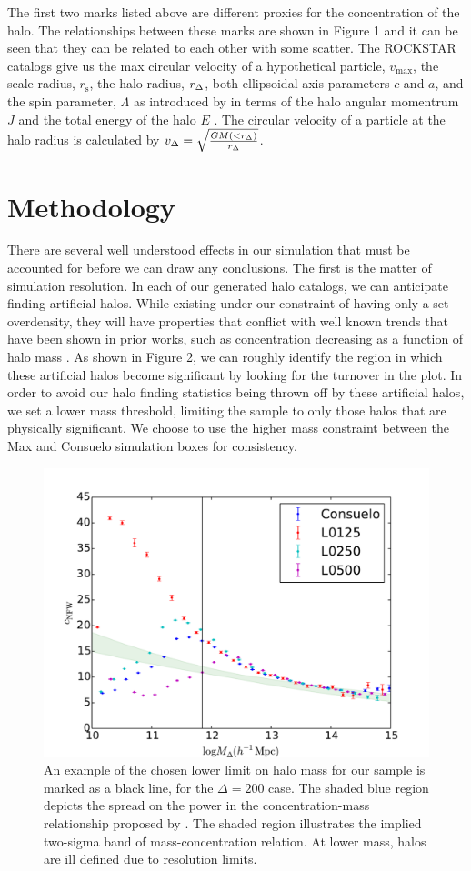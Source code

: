 \documentclass[usenatbib,usegraphicx,letterpaper]{mn2e}
\begin{document}
The first two marks listed above are different proxies for the concentration of the halo. The relationships between these marks are shown in Figure 1 and it can be seen that they can be related to each other with some scatter. The ROCKSTAR catalogs give us the max  circular velocity of a hypothetical particle, $v_{\mathrm{max}}$, the scale radius, $r_{\mathrm{s}}$, the halo radius, $r_{\Delta}$, both ellipsoidal axis parameters $c$ and $a$, and the spin parameter, $\Lambda$ as introduced by \citep{peebles69} in terms of the halo angular momentrum $J$ and the total energy of the halo $E$ . The circular velocity of a particle at the halo radius is calculated by $v_{\Delta} = \sqrt{\frac{G M(< r_{\Delta})}{r_{\Delta}}}$.

\section[]{Methodology}
\label{section:methodology}

There are several well understood effects in our simulation that must be accounted for before we can draw any conclusions. The first is the matter of simulation resolution. In each of our generated halo catalogs, we can anticipate finding artificial halos. While existing under our constraint of having only a set overdensity, they will have properties that conflict with well known trends that have been shown in prior works, such as concentration decreasing as a function of halo mass \citep{wechsler06}. As shown in Figure 2, we can roughly identify the region in which these artificial halos become significant by looking for the turnover in the plot. In order to avoid our halo finding statistics being thrown off by these artificial halos, we set a lower mass threshold, limiting the sample to only those halos that are physically significant. We choose to use the higher mass constraint between the Max and Consuelo simulation boxes for consistency.

\begin{figure}
	\centering
		\includegraphics[width=.5\textwidth]{masscut_cnfw_d200.pdf}
	\caption{An example of the chosen lower limit on halo mass for our sample is marked as a black line, for the $\Delta = 200$ case. The shaded blue region depicts the spread on the power in the concentration-mass relationship proposed by \citet{duffy08}.  The shaded region illustrates the implied two-sigma band of \citet{duffy08} mass-concentration relation. At lower mass, halos are ill defined due to resolution limits.}
\end{figure}
\end{document}
